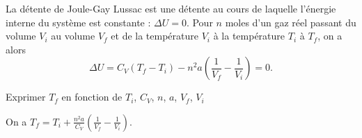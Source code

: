 \hauteurLargeurCadreReponse		{8mm}{5cm}
\typeEntrainement				{} %
\initialisationEntrainement

La détente de Joule-Gay Lussac est une détente au cours de laquelle l'énergie interne du système est constante : $\Delta U=0$.
Pour $n$ moles d'un gaz réel passant du volume $V_i$ au volume $V_f$ et de la température $V_i$ à la température $T_i$ à $T_f$,
on a alors \minusMedskip
\[
\Delta U= C_V(T_f - T_i)-n^2a \left(\frac{1}{V_f}-\frac{1}{V_i}\right) = 0.
\]

\minusBigskip

\debutEntrainement



\begin{enonce}
Exprimer $T_f$ en fonction de $T_i$, $C_V$, $n$, $a$, $V_f$, $V_i$
\end{enonce}


\begin{corrige}
On a $T_f=T_i+\frac{n^2a}{C_V}\left(\frac{1}{V_f}-\frac{1}{V_i}\right)$.
\end{corrige}


\finEntrainement




\minusMedskip


